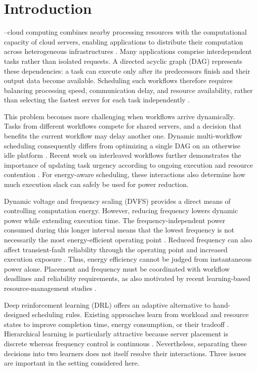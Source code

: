 \documentclass[lettersize,journal]{IEEEtran}
\begin{document}
\section{Introduction}
\label{sec:introduction}

--cloud computing combines nearby processing
resources with the computational capacity of cloud servers, enabling
applications to distribute their computation across heterogeneous
infrastructures \cite{luo2021survey}. Many applications comprise
interdependent tasks rather than isolated requests. A directed acyclic
graph (DAG) represents these dependencies: a task can execute only after
its predecessors finish and their output data become available. Scheduling
such workflows therefore requires balancing processing speed,
communication delay, and resource availability, rather than selecting
the fastest server for each task independently
\cite{topcuoglu2002,jayanetti2022}.

This problem becomes more challenging when workflows arrive dynamically.
Tasks from different workflows compete for shared servers, and a decision
that benefits the current workflow may delay another one. Dynamic
multi-workflow scheduling consequently differs from optimizing a single
DAG on an otherwise idle platform \cite{arabnejad2019}. Recent work on
interleaved workflows further demonstrates the importance of updating
task urgency according to ongoing execution and resource contention
\cite{cai2025interleaved}. For energy-aware scheduling, these interactions
also determine how much execution slack can safely be used for power
reduction.

Dynamic voltage and frequency scaling (DVFS) provides a direct means of
controlling computation energy. However, reducing frequency lowers
dynamic power while extending execution time. The frequency-independent
power consumed during this longer interval means that the lowest
frequency is not necessarily the most energy-efficient operating point
\cite{xie2017energy}. Reduced frequency can also affect transient-fault
reliability through the operating point and increased execution exposure
\cite{zhu2004,wu2018}. Thus, energy efficiency cannot be judged from
instantaneous power alone. Placement and frequency must be coordinated
with workflow deadlines and reliability requirements, as also motivated
by recent learning-based resource-management studies
\cite{oustad2025dist,esnaashari2025dream}.

Deep reinforcement learning (DRL) offers an adaptive alternative to
hand-designed scheduling rules. Existing approaches learn from workload
and resource states to improve completion time, energy consumption, or
their tradeoff \cite{chen2023,pan2024,wen2026}. Hierarchical learning is
particularly attractive because server placement is discrete whereas
frequency control is continuous \cite{zhu2026hirl}. Nevertheless,
separating these decisions into two learners does not itself resolve
their interactions. Three issues are important in the setting considered
here.
\end{document}
